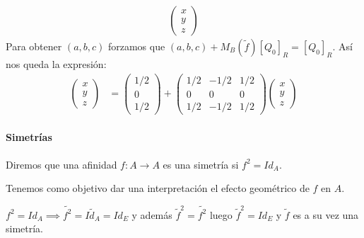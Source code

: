 \documentclass[14pt]{book}
\begin{document}
\begin{ej}
\begin{align*}
	\left(\begin{array}{c}
	x \\ y \\ z
	\end{array}\right)
	\end{align*}
	Para obtener $(a, b, c)$ forzamos que $(a,b,c) + M_B({\tilde{f}})[Q_0]_R = [Q_0]_R$. Así nos queda la expresión:
	\begin{align*}
	\left(\begin{array}{c}
	x \\ y \\ z
	\end{array}\right) &=
	\left(\begin{array}{c}
	1/2 \\ 0 \\ 1/2
	\end{array}\right) +
	\left(\begin{array}{ccc}
	1/2 & -1/2 & 1/2 \\ 0 & 0 & 0 \\ 1/2 & -1/2 & 1/2
	\end{array}\right)
	\left(\begin{array}{c}
	x \\ y \\ z
	\end{array}\right)
	\end{align*}
\end{ej}

\paragraph{Simetrías}

\begin{dfn}
	Diremos que una afinidad $f: A \to A$ es una simetría si $f^2 = Id_A$.
\end{dfn}

Tenemos como objetivo dar una interpretación el efecto geométrico de $f$ en $A$.

\begin{obs}
	$f^2 = Id_A \implies \widetilde{f^2} = \widetilde{Id_A} = Id_E$  y además $\tilde{f}^2 = \widetilde{f^2}$ luego $\tilde{f}^2 = Id_E$ y $\tilde{f}$ es a su vez una simetría.
\end{obs}
\end{document}
